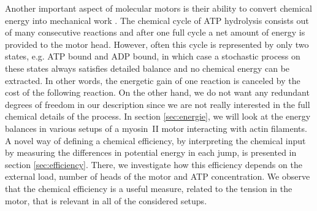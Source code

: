 \documentclass[aps,pre,twocolumn,showpacs,showkeys,superscriptaddress,floatfix]{revtex4-1}
\begin{document}
Another important aspect of molecular motors is their ability to convert chemical energy into mechanical work \cite{astumian1996mechanochemical}.
The chemical cycle of ATP hydrolysis consists out of many consecutive reactions and after one full cycle a net amount of energy is provided to the motor head\cite{gajewski1986thermodynamics}.
However, often this cycle is represented by only two states\cite{julicher1997modeling,Reimann2002introduction}, e.g. ATP bound and ADP bound, 
in which case a stochastic process on these states always satisfies detailed balance and no chemical energy can be extracted. 
In other words, the energetic gain of one reaction is canceled by the cost of the following reaction.
On the other hand, we do not want any redundant degrees of freedom in our description since we are not really interested in the full chemical details of the process.
In section \ref{sec:energie}, we will look at the energy balances in various setups of a myosin~II motor interacting with actin filaments.
A novel way of defining a chemical efficiency, by interpreting the chemical input by measuring the differences in potential energy in each jump, is presented in section \ref{sec:efficiency}.
There, we investigate how this efficiency depends on the external load, number of heads of the motor and ATP concentration. 
We observe that the chemical efficiency is a useful measure, related to the tension in the motor, that is relevant in all of the considered setups.
\end{document}
